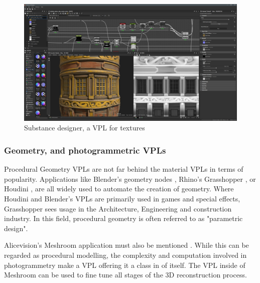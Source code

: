 \begin{figure}
  \centering
  \graphicspath{{../../assets/images/3/}}
  \includegraphics[width=\linewidth]{substance-designer.jpg}
  \caption[Geometry VPL]{Substance designer, a VPL for textures \citep{rutten_grasshopper_2012}}
  \label{fig:texture-vpl}
\end{figure}

\subsubsection*{Geometry, and photogrammetric VPLs}

Procedural Geometry \ac{VPL}s are not far behind the material \ac{VPL}s in terms of popularity.
Applications like Blender's geometry nodes \citep{blender_foundation_geometry_2022}, Rhino's Grasshopper \citep{rutten_grasshopper_2012}, or \\ Houdini \citep{sidefx_houdini_2022}, are all widely used to automate the creation of geometry. 
Where Houdini and Blender's VPLs are primarily used in games and special effects, Grasshopper sees usage in the Architecture, Engineering and construction industry. 
In this field, procedural geometry is often referred to as "parametric design".

Alicevision's Meshroom application must also be mentioned \citep{alicevision_meshroom_2022}.
While this can be regarded as procedural modelling, the complexity and computation involved in photogrammetry make a VPL offering it a class in of itself. 
The VPL inside of Meshroom can be used to fine tune all stages of the 3D reconstruction process.

